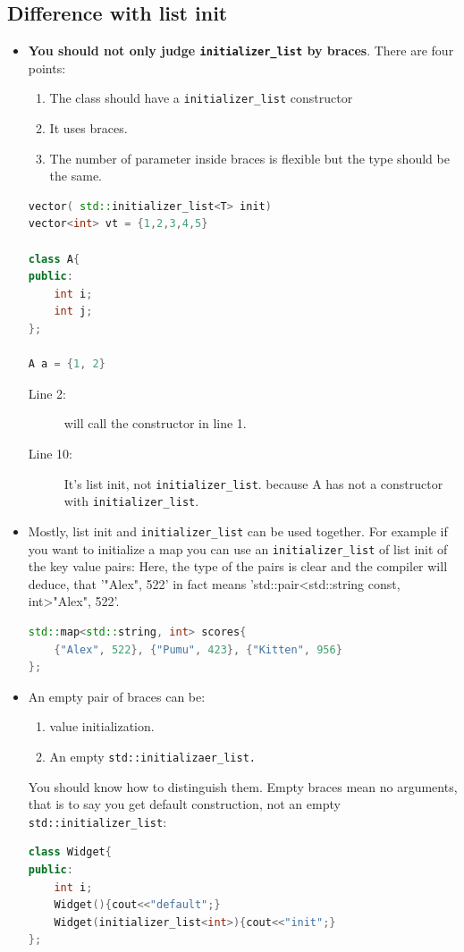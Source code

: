 \documentclass[a4paper,11pt,twoside]{book}
\begin{document}
\subsection{Difference with list init}
\begin{itemize}
	\item  \textbf{You should not only judge \texttt{initializer\_list} by braces}. There are four points:
	\begin{enumerate}
		\item The class should have a \texttt{initializer\_list} constructor 
		\item It uses braces.
		\item The number of parameter inside braces is flexible but the type should be the same.
	\end{enumerate}

\begin{lstlisting}[frame=single, language=c++,mathescape=true]
vector( std::initializer_list<T> init)
vector<int> vt = {1,2,3,4,5}  
	
class A{
public:
	int i;
	int j;
};
	
A a = {1, 2} 
\end{lstlisting}

\begin{description}
	\item[Line 2:] will call the constructor in line 1.
	\item[Line 10:] It's list init, not \texttt{initializer\_list}. because A has not a constructor with \newline 
	\texttt{initializer\_list}.
\end{description}
	
	\item Mostly, list init and \texttt{initializer\_list} can be used together. For example if you want to initialize a map you can use an \texttt{initializer\_list} of list init of the key value pairs: Here, the type of the pairs is clear and the compiler will deduce, that '{"Alex", 522}' in fact means 'std::pair<std::string const, int>{"Alex", 522}'.
	
\begin{lstlisting}[frame=single, language=c++,mathescape=true]
std::map<std::string, int> scores{ 
	{"Alex", 522}, {"Pumu", 423}, {"Kitten", 956} 
};
\end{lstlisting}

	\item An empty pair of braces can be:
	\begin{enumerate}
		\item value initialization.
		\item An empty \texttt{std::initializaer\_list.}
	\end{enumerate}
	You should know how to distinguish them.  Empty braces mean no arguments, that is to say you get default construction, not an empty \texttt{std::initializer\_list}:
\begin{lstlisting}[frame=single, language=c++,mathescape=true]
class Widget{
public:
	int i;
	Widget(){cout<<"default";}
	Widget(initializer_list<int>){cout<<"init";}
};
	

\end{lstlisting}
\end{itemize}
\end{document}
